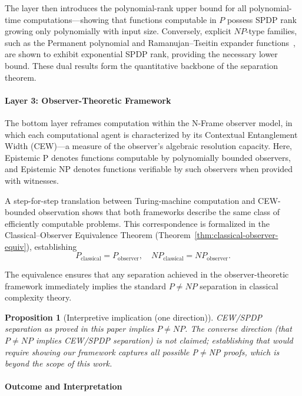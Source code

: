 \documentclass[12pt]{article}
\newtheorem{proposition}[theorem]{Proposition}
\theoremstyle{definition}
\theoremstyle{definition}
\theoremstyle{remark}
\theoremstyle{remark}
\begin{document}
The layer then introduces the polynomial-rank upper bound for all polynomial-time computations---showing that functions computable in $P$ possess SPDP rank growing only polynomially with input size. Conversely, explicit $NP$-type families, such as the Permanent polynomial and Ramanujan--Tseitin expander functions~\cite{tseitin1983,lps1988}, are shown to exhibit exponential SPDP rank, providing the necessary lower bound. These dual results form the quantitative backbone of the separation theorem.

\paragraph{Layer 3: Observer-Theoretic Framework}

The bottom layer reframes computation within the N-Frame observer model, in which each computational agent is characterized by its Contextual Entanglement Width (CEW)---a measure of the observer's algebraic resolution capacity. Here, Epistemic P denotes functions computable by polynomially bounded observers, and Epistemic NP denotes functions verifiable by such observers when provided with witnesses.

A step-for-step translation between Turing-machine computation and CEW-bounded observation shows that both frameworks describe the same class of efficiently computable problems. This correspondence is formalized in the Classical--Observer Equivalence Theorem (Theorem~\ref{thm:classical-observer-equiv}), establishing
\[
P_{\mathrm{classical}} = P_{\mathrm{observer}}, \quad NP_{\mathrm{classical}} = NP_{\mathrm{observer}}.
\]

The equivalence ensures that any separation achieved in the observer-theoretic framework immediately implies the standard $P \neq NP$ separation in classical complexity theory.

\begin{proposition}[Interpretive implication (one direction)]
\label{prop:one-way-implication}
CEW/SPDP separation as proved in this paper implies $P\ne NP$.
The converse direction (that $P\ne NP$ implies CEW/SPDP separation) is not claimed;
establishing that would require showing our framework captures \emph{all} possible
P$\neq$NP proofs, which is beyond the scope of this work.
\end{proposition}

\paragraph{Outcome and Interpretation}
\end{document}

